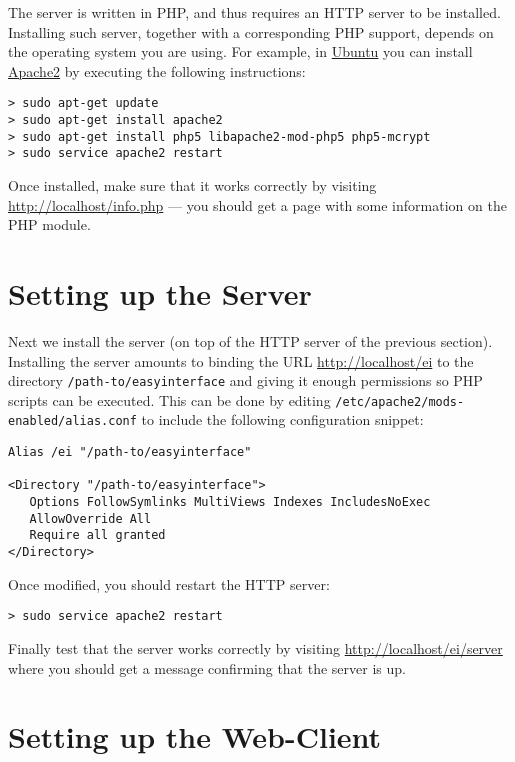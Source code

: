 The \ei server is written in PHP, and thus requires an HTTP server to
be installed. Installing such server, together with a corresponding
PHP support, depends on the operating system you are using. For
example, in \href{http://www.ubuntu.com}{Ubuntu} you can install
\href{http://httpd.apache.org/}{Apache2} by executing the following
instructions:

\medskip
\begin{lstlisting}
> sudo apt-get update
> sudo apt-get install apache2
> sudo apt-get install php5 libapache2-mod-php5 php5-mcrypt
> sudo service apache2 restart
\end{lstlisting}

\medskip
\noindent
Once installed, make sure that it works correctly by visiting
\url{http://localhost/info.php} --- you should get a page with some
information on the PHP module.

\section{Setting up the \ei Server}

Next we install the \ei server (on top of the HTTP server of the
previous section).
%
Installing the \ei server amounts to binding the URL
\url{http://localhost/ei} to the directory
\texttt{/path-to/easyinterface} and giving it enough permissions so PHP
scripts can be executed. This can be done by editing
\texttt{/etc/apache2/mods-enabled/alias.conf} to include the following
configuration snippet:

\medskip
\noindent
\begin{lstlisting}
Alias /ei "/path-to/easyinterface"

<Directory "/path-to/easyinterface">
   Options FollowSymlinks MultiViews Indexes IncludesNoExec
   AllowOverride All
   Require all granted
</Directory>
\end{lstlisting}

\medskip
\noindent
Once modified, you should restart the HTTP server:

\medskip
\begin{lstlisting}
> sudo service apache2 restart
\end{lstlisting}

\medskip
\noindent
Finally test that the \ei server works correctly by visiting
\url{http://localhost/ei/server} where you should get a message
confirming that the server is up.


\section{Setting up the \ei Web-Client}

